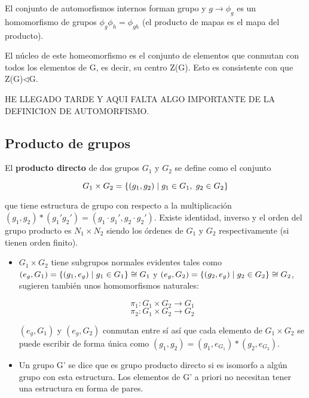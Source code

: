 El conjunto de automorfismos internos forman grupo y $g \to \phi _g$ es un homomorfismo de grupos $\phi _g \phi _h=\phi _{gh}$ (el producto de mapas es el mapa del producto).

El núcleo de este homeomorfismo es el conjunto de elementos que conmutan con todos los elementos de G, es decir, su centro Z(G). Esto es consistente con que Z(G)$\lhd$G.

\smallskip
HE LLEGADO TARDE Y AQUI FALTA ALGO IMPORTANTE DE LA DEFINICION DE AUTOMORFISMO.

\subsection{Producto de grupos}

El \textbf{producto directo} de dos grupos $G_1$ y $G_2$ se define como el conjunto

$$G_1\times G_2=\lbrace (g_1,g_2) \hspace{0.1cm}| \hspace{0.1cm} g_1 \in G_1, \hspace{0.1cm} g_2\in G_2\rbrace$$

que tiene estructura de grupo con respecto a la multiplicación $(g_1,g_2)*(g_1'g_2')=(g_1\cdot g_1',g_2\cdot g_2')$. Existe identidad, inverso y el orden del grupo producto es $N_1\times N_2$ siendo los órdenes de $G_1$ y $G_2$ respectivamente (si tienen orden finito).

\begin{itemize}
\item $G_1 \times G_2$ tiene subgrupos normales evidentes tales como $(e_g,G_1)=\lbrace (g_1,e_g) \hspace{0.1cm} | \hspace{0.1cm}g_1 \in G_1 \rbrace \cong G_1$ y $(e_g,G_2)=\lbrace (g_2,e_g) \hspace{0.1cm} | \hspace{0.1cm}g_2 \in G_2 \rbrace \cong G_2$, sugieren también unos homomorfismos naturales:

$$\pi _1: G_1\times G_2 \to G_1$$
$$\pi _2 : G_1\times G_2 \to G_2$$

$(e_g,G_1)$ y $(e_g,G_2)$ conmutan entre sí así que cada elemento de $G_1 \times G_2$ se puede escribir de forma única como $(g_1,g_2)=(g_1,e_{G_1})*(g_2,e_{G_2})$.
\item Un grupo G' se dice que es grupo producto directo si es isomorfo a algún grupo con esta estructura. Los elementos de G' a priori no necesitan tener una estructura en forma de pares.

\end{itemize}

